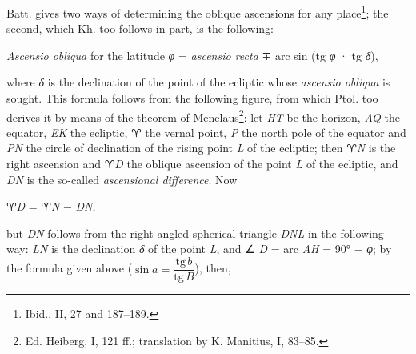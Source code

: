 \documentclass[11pt]{article}
\begin{document}
\par Batt. gives two ways of determining the oblique ascensions for any place\footnote{Ibid., II, 27 and 187–189.}; the second, which Kh. too follows in part, is the following:\par
\par\begin{center}\emph{Ascensio obliqua} for the latitude \emph{{\greekfont φ}} = \emph{ascensio recta} {\SignFont\upshape ∓} arc sin (tg \emph{{\greekfont φ}} · tg \emph{{\greekfont δ}}),\end{center}
\par where \emph{{\greekfont δ}} is the declination of the point of the ecliptic whose \emph{ascensio obliqua} is sought. This formula follows from the following figure, from which Ptol. too derives it by means of the theorem of Menelaus\footnote{Ed. Heiberg, I, 121 ff.; translation by K. Manitius, I, 83–85.}: let \emph{HT} be the horizon, \emph{AQ} the equator, \emph{EK} the ecliptic, {\SignFont\upshape ♈} the vernal point, \emph{P} the north pole of the equator and \emph{PN} the circle of declination of the rising point \emph{L} of the ecliptic; then {\SignFont\upshape ♈}\emph{N} is the right ascension and {\SignFont\upshape ♈}\emph{D} the oblique ascension of the point \emph{L} of the ecliptic, and \emph{DN} is the so-called \emph{ascensional difference}. Now\par
\par\begin{center}{\SignFont\upshape ♈}\emph{D} = {\SignFont\upshape ♈}\emph{N} − \emph{DN},\end{center}
\par but \emph{DN} follows from the right-angled spherical triangle \emph{DNL} in the following way: \emph{LN} is the declination \emph{{\greekfont δ}} of the point \emph{L}, and {\SignFont\upshape ∠} \emph{D} = arc \emph{AH} = 90° − \emph{{\greekfont φ}}; by the formula given above ($\sin a = \dfrac{\mathrm{tg}\,b}{\mathrm{tg}\,B}$), then,\par
\end{document}
